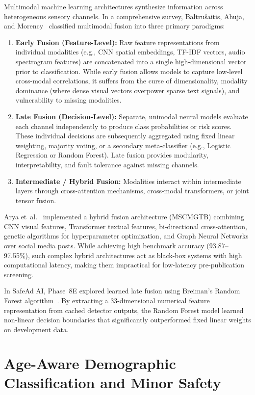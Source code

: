 \documentclass[12pt,a4paper]{report}
\begin{document}
Multimodal machine learning architectures synthesize information across heterogeneous sensory channels. In a comprehensive survey, Baltru\v{s}aitis, Ahuja, and Morency~\cite{baltrusaitis2018multimodal} classified multimodal fusion into three primary paradigms:
\begin{enumerate}
    \item \textbf{Early Fusion (Feature-Level):} Raw feature representations from individual modalities (e.g., CNN spatial embeddings, TF-IDF vectors, audio spectrogram features) are concatenated into a single high-dimensional vector prior to classification. While early fusion allows models to capture low-level cross-modal correlations, it suffers from the curse of dimensionality, modality dominance (where dense visual vectors overpower sparse text signals), and vulnerability to missing modalities.
    \item \textbf{Late Fusion (Decision-Level):} Separate, unimodal neural models evaluate each channel independently to produce class probabilities or risk scores. These individual decisions are subsequently aggregated using fixed linear weighting, majority voting, or a secondary meta-classifier (e.g., Logistic Regression or Random Forest). Late fusion provides modularity, interpretability, and fault tolerance against missing channels.
    \item \textbf{Intermediate / Hybrid Fusion:} Modalities interact within intermediate layers through cross-attention mechanisms, cross-modal transformers, or joint tensor fusion.
\end{enumerate}

Arya et~al.~\cite{arya2024} implemented a hybrid fusion architecture (MSCMGTB) combining CNN visual features, Transformer textual features, bi-directional cross-attention, genetic algorithms for hyperparameter optimization, and Graph Neural Networks over social media posts. While achieving high benchmark accuracy (93.87--97.55\%), such complex hybrid architectures act as black-box systems with high computational latency, making them impractical for low-latency pre-publication screening.

In SafeAd AI, Phase~8E explored learned late fusion using Breiman's Random Forest algorithm~\cite{breiman2001random}. By extracting a 33-dimensional numerical feature representation from cached detector outputs, the Random Forest model learned non-linear decision boundaries that significantly outperformed fixed linear weights on development data.

\section{Age-Aware Demographic Classification and Minor Safety}
\end{document}
